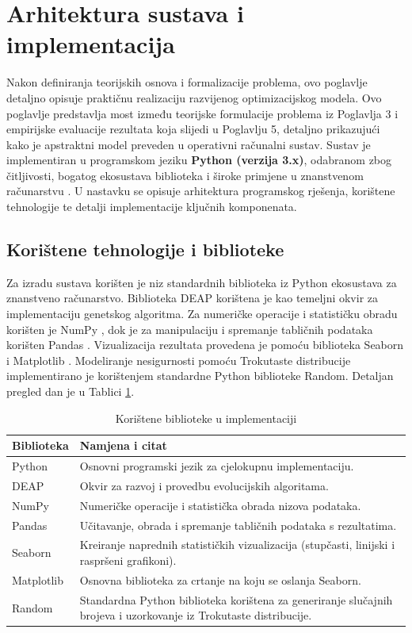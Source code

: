 \section{Arhitektura sustava i implementacija}
\label{chap:implementacija}

Nakon definiranja teorijskih osnova i formalizacije problema, ovo poglavlje detaljno opisuje praktičnu realizaciju razvijenog optimizacijskog modela. Ovo poglavlje predstavlja most između teorijske formulacije problema iz Poglavlja 3 i empirijske evaluacije rezultata koja slijedi u Poglavlju 5, detaljno prikazujući kako je apstraktni model preveden u operativni računalni sustav. Sustav je implementiran u programskom jeziku \textbf{Python (verzija 3.x)}, odabranom zbog čitljivosti, bogatog ekosustava biblioteka i široke primjene u znanstvenom računarstvu \cite{PythonSoftwareFoundation}. U nastavku se opisuje arhitektura programskog rješenja, korištene tehnologije te detalji implementacije ključnih komponenata.
\subsection{Korištene tehnologije i biblioteke}
Za izradu sustava korišten je niz standardnih biblioteka iz Python ekosustava za znanstveno računarstvo. Biblioteka DEAP \cite{DEAP2012} korištena je kao temeljni okvir za implementaciju genetskog algoritma. Za numeričke operacije i statističku obradu korišten je NumPy \cite{Harris2020}, dok je za manipulaciju i spremanje tabličnih podataka korišten Pandas \cite{PandasDevelopmentTeam2020}. Vizualizacija rezultata provedena je pomoću biblioteka Seaborn \cite{Waskom2021} i Matplotlib \cite{Hunter2007}. Modeliranje nesigurnosti pomoću Trokutaste distribucije implementirano je korištenjem standardne Python biblioteke Random. Detaljan pregled dan je u Tablici \ref{tab:biblioteke}.
\begin{table}[H]
\centering
\caption{Korištene biblioteke u implementaciji}
\label{tab:biblioteke}
\begin{tabular}{|l|p{10cm}|}
\hline
\textbf{Biblioteka} & \textbf{Namjena i citat} \\ \hline
Python & Osnovni programski jezik za cjelokupnu implementaciju. \cite{PythonSoftwareFoundation} \\ \hline
DEAP & Okvir za razvoj i provedbu evolucijskih algoritama. \cite{DEAP2012} \\ \hline
NumPy & Numeričke operacije i statistička obrada nizova podataka. \cite{Harris2020} \\ \hline
Pandas & Učitavanje, obrada i spremanje tabličnih podataka s rezultatima. \cite{PandasDevelopmentTeam2020} \\ \hline
Seaborn & Kreiranje naprednih statističkih vizualizacija (stupčasti, linijski i raspršeni grafikoni). \cite{Waskom2021} \\ \hline
Matplotlib & Osnovna biblioteka za crtanje na koju se oslanja Seaborn. \cite{Hunter2007} \\ \hline
Random & Standardna Python biblioteka korištena za generiranje slučajnih brojeva i uzorkovanje iz Trokutaste distribucije. \\ \hline
\end{tabular}
\end{table}

